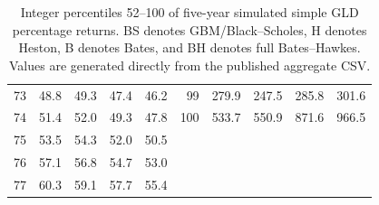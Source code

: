 \documentclass[a4paper,10pt,titlepage,oneside,openany]{book}
\theoremstyle{plain}
\theoremstyle{definition}
\theoremstyle{remark}
\begin{document}
\begin{table}[p]
\begin{tabular}{@{}rrrrr@{\hspace{8mm}}rrrrr@{}}
73 & 48.8 & 49.3 & 47.4 & 46.2 & 99 & 279.9 & 247.5 & 285.8 & 301.6 \\
74 & 51.4 & 52.0 & 49.3 & 47.8 & 100 & 533.7 & 550.9 & 871.6 & 966.5 \\
75 & 53.5 & 54.3 & 52.0 & 50.5 &  &  &  &  &  \\
76 & 57.1 & 56.8 & 54.7 & 53.0 &  &  &  &  &  \\
77 & 60.3 & 59.1 & 57.7 & 55.4 &  &  &  &  &  \\
\bottomrule
\end{tabular}
\caption{Integer percentiles 52--100 of five-year simulated simple GLD percentage returns. BS denotes GBM/Black--Scholes, H denotes Heston, B denotes Bates, and BH denotes full Bates--Hawkes. Values are generated directly from the published aggregate CSV.}
\label{tab:appendix-percentiles-52-100}
\end{table}
\end{document}
